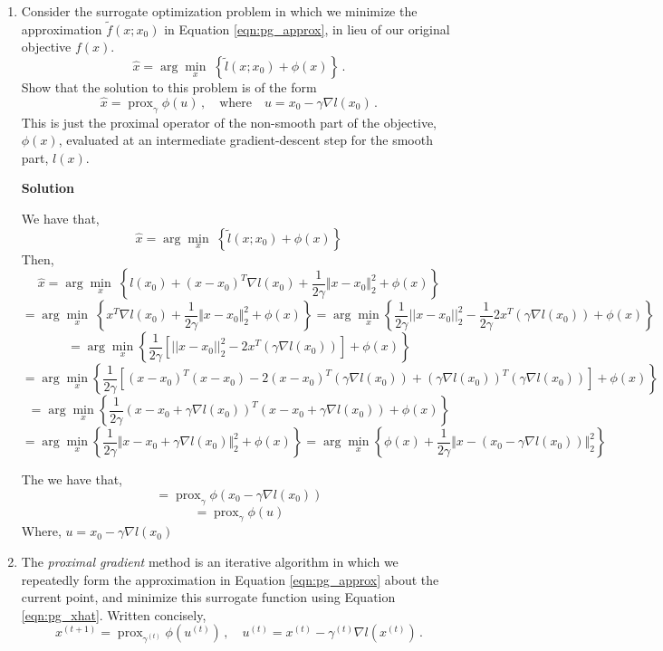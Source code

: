 \documentclass[11 pt]{article}
\newcommand{\prox}{ \mathop{\mathrm{prox}} }
\newcommand{\enorm}[1]{\Vert #1 \Vert_2}
\begin{document}
	
	\begin{enumerate}[label=(\Alph*)]
	\item Consider the surrogate optimization problem in which we minimize the approximation $\tilde{f}(x; x_0)$ in Equation \ref{eqn:pg_approx}, in lieu of our original objective $f(x)$. 
	$$
	\hat{x} = \arg \min_x \; \left\{   \tilde{l}(x; x_0) + \phi(x)  \right\} \, .
	$$
	Show that the solution to this problem is of the form
	\begin{equation}
	\label{eqn:pg_xhat}
	\hat{x} = \prox_{\gamma} \phi(u) \, , \quad \mbox{where} \quad u = x_0 - \gamma \nabla l(x_0) \, .
	\end{equation}
	This is just the proximal operator of the non-smooth part of the objective, $\phi(x)$, evaluated at an intermediate gradient-descent step for the smooth part, $l(x)$.
	
	\vspace{2mm}
	\textbf{Solution}
	
	We have that,
	$$
	\hat{x} = \arg \min_x \; \left\{   \tilde{l}(x; x_0) + \phi(x)  \right\} $$
	Then,
	$$
	\hat{x} = \arg \min_x \; \left\{  l(x_0) + (x - x_0)^T \nabla l(x_0) + \frac{1}{2\gamma} \enorm{x - x_0}^2 + \phi(x)  \right\} $$
	$$
	= \arg \min_x \; \left\{ x ^T \nabla l(x_0) + \frac{1}{2\gamma} \enorm{x - x_0}^2 + \phi(x)  \right\} 
	= \arg \min_{x} \left\{  \frac{1}{2\gamma} ||x - x_0||^2_2 - \frac{1}{2\gamma} 2x^T(\gamma \nabla l(x_0))  + \phi(x) \right\} $$
	$$
	= \arg \min_{x} \left\{ \frac{1}{2\gamma} \left[ ||x - x_0||^2_2 - 2x^T(\gamma \nabla l(x_0))  \right] + \phi(x) \right\} $$
	$$
	= \arg \min_{x} \left\{ \frac{1}{2\gamma} \left[ (x - x_0)^T(x - x_0) - 2(x - x_0)^T(\gamma \nabla l(x_0)) + ( \gamma \nabla l(x_0))^T(\gamma \nabla l(x_0)) \right] + \phi(x) \right\} 
	$$
	$$ 	= \arg \min_{x} \left\{ \frac{1}{2\gamma} (x - x_0 + \gamma \nabla l(x_0))^T(x - x_0 + \gamma \nabla l(x_0)) + \phi(x) \right\} $$
	$$
	= \arg \min_{x} \left\{ \frac{1}{2\gamma} \enorm{x - x_0 + \gamma \nabla l(x_0)}^2 + \phi(x) \right\} 
	= \arg \min_{x} \left\{  \phi(x)+ \frac{1}{2\gamma} \enorm{x - (x_0 - \gamma \nabla l(x_0))}^2  \right\} $$
	
	The we have that,
	$$
	= \prox_{\gamma} \phi(x_0 - \gamma \nabla l(x_0)) $$
	$$
	= \prox_{\gamma} \phi(u) $$
	Where, $ u = x_0 - \gamma \nabla l(x_0) $
	
	
	
	\newpage
	\item The \textit{proximal gradient} method is an iterative algorithm in which we repeatedly form the approximation in Equation \ref{eqn:pg_approx} about the current point, and minimize this surrogate function using Equation \ref{eqn:pg_xhat}.  Written concisely,
	$$
	x^{(t+1)} = \prox_{\gamma^{(t)}} \phi(u^{(t)}) \, , \quad u^{(t)} = x^{(t)} - \gamma^{(t)} \nabla l(x^{(t)}) \, .
	$$
	

\end{enumerate}
\end{document}
